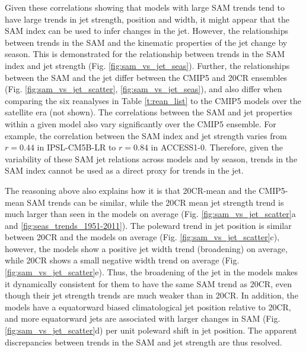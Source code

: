 \documentclass{ametsoc}
\begin{document}
Given these correlations showing that models with large SAM trends tend to have large trends 
in jet strength, position and width, it might appear that the SAM index can be used to infer
changes in the jet. However, the relationships between trends in the SAM and the kinematic
properties of the jet change by season. This is demonstrated for the relationship between
trends in the SAM index and jet strength (Fig. \ref{fig:sam_vs_jet_seas}). Further, the relationships between
the SAM and the jet differ between the CMIP5 and 20CR ensembles (Fig. \ref{fig:sam_vs_jet_scatter},
\ref{fig:sam_vs_jet_seas}), and also differ when comparing the six reanalyses in Table \ref{t:rean_list} 
to the CMIP5 models over the satellite era (not shown). The correlations between the SAM and jet 
properties within a given model also vary significantly over the CMIP5 ensemble. For example, the correlation 
between the SAM index and jet strength varies from $r=0.44$ in IPSL-CM5B-LR to $r=0.84$ in ACCESS1-0. 
Therefore, given the variability of these SAM jet relations across models and by season, trends in the SAM 
index cannot be used as a direct proxy for trends in the jet.

The reasoning above also explains how it is that 20CR-mean and the CMIP5-mean SAM 
trends can be similar,
while the 20CR mean jet strength trend is much larger than seen in the models on average 
(Fig. \ref{fig:sam_vs_jet_scatter}a and \ref{fig:seas_trends_1951-2011}). The poleward trend 
in jet position is similar between 20CR and the models
on average (Fig. \ref{fig:sam_vs_jet_scatter}c), however, the models show a positive jet width trend 
(broadening) on average, while 20CR shows a small negative width trend on average 
(Fig. \ref{fig:sam_vs_jet_scatter}e). Thus,
the broadening of the jet in the models makes it dynamically consistent for them to have the same 
SAM trend as 20CR, even though their jet strength trends are much weaker than in 20CR. In addition, 
the models have a equatorward biased climatological jet position relative to 20CR, and more 
equatorward jets are associated with larger changes in SAM (Fig. \ref{fig:sam_vs_jet_scatter}d) 
per unit poleward shift in jet position. The apparent discrepancies between trends in the SAM and
jet strength are thus resolved.  
\end{document}
